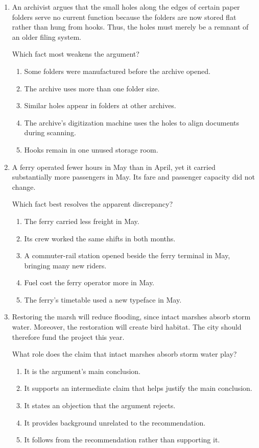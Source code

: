\begin{enumerate}
\item An archivist argues that the small holes along the edges of certain paper folders serve no current function because the folders are now stored flat rather than hung from hooks. Thus, the holes must merely be a remnant of an older filing system.

Which fact most weakens the argument?
\begin{enumerate}
\item[(A)] Some folders were manufactured before the archive opened.
\item[(B)] The archive uses more than one folder size.
\item[(C)] Similar holes appear in folders at other archives.
\item[(D)] The archive's digitization machine uses the holes to align documents during scanning.
\item[(E)] Hooks remain in one unused storage room.
\end{enumerate}

\item A ferry operated fewer hours in May than in April, yet it carried substantially more passengers in May. Its fare and passenger capacity did not change.

Which fact best resolves the apparent discrepancy?
\begin{enumerate}
\item[(A)] The ferry carried less freight in May.
\item[(B)] Its crew worked the same shifts in both months.
\item[(C)] A commuter-rail station opened beside the ferry terminal in May, bringing many new riders.
\item[(D)] Fuel cost the ferry operator more in May.
\item[(E)] The ferry's timetable used a new typeface in May.
\end{enumerate}

\item Restoring the marsh will reduce flooding, since intact marshes absorb storm water. Moreover, the restoration will create bird habitat. The city should therefore fund the project this year.

What role does the claim that intact marshes absorb storm water play?
\begin{enumerate}
\item[(A)] It is the argument's main conclusion.
\item[(B)] It supports an intermediate claim that helps justify the main conclusion.
\item[(C)] It states an objection that the argument rejects.
\item[(D)] It provides background unrelated to the recommendation.
\item[(E)] It follows from the recommendation rather than supporting it.
\end{enumerate}


\end{enumerate}
